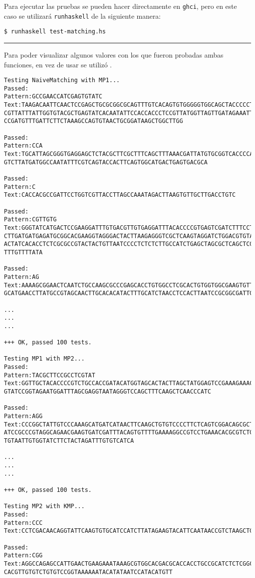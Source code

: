 Para ejecutar las pruebas se pueden hacer directamente en \texttt{ghci}, pero en 
este caso se utilizará \texttt{runhaskell} de la siguiente manera:

\texttt{\$ runhaskell test-matching.hs}

\noindent\rule{\textwidth}{1pt}
Para poder visualizar algunos valores con los que fueron probadas ambas 
funciones, en vez de usar  se utilizó .

\begin{verbatim}
Testing NaiveMatching with MP1...
Passed:
Pattern:GCCGAACCATCGAGTGTATC
Text:TAAGACAATTCAACTCCGAGCTGCGCGGCGCAGTTTGTCACAGTGTGGGGGTGGCAGCTACCCCCTAAG
CGTTATTTATTGGTGTACGCTGAGTATCACAATATTCCACCACCCTCCGTTATGGTTAGTTGATAGAAATTCGA
CCGATGTTTGATTCTTCTAAAGCCAGTGTAACTGCGGATAAGCTGGCTTGG

Passed:
Pattern:CCA
Text:TGCATTAGCGGGTGAGGAGCTCTACGCTTCGCTTTCAGCTTTAAACGATTATGTGCGGTCACCCCAATT
GTCTTATGATGGCCAATATTTCGTCAGTACCACTTCAGTGGCATGACTGAGTGACGCA

Passed:
Pattern:C
Text:CACCACGCCGATTCCTGGTCGTTACCTTAGCCAAATAGACTTAAGTGTTGCTTGACCTGTC

Passed:
Pattern:CGTTGTG
Text:GGGTATCATGACTCCGAAGGATTTGTGACGTTGTGAGGATTTACACCCCGTGAGTCGATCTTTCCTGGT
CTTGATGATGAGATGCGGCACGAAGGTAGGGACTACTTAAGAGGGTCGCTCAAGTAGGATCTGGACGTGTACAG
ACTATCACACCTCTCGCGCCGTACTACTGTTAATCCCCTCTCTCTTGCCATCTGAGCTAGCGCTCAGCTCGATA
TTTGTTTTATA

Passed:
Pattern:AG
Text:AAAAGCGGAACTCAATCTGCCAAGCGCCCGAGCACCTGTGGCCTCGCACTGTGGTGGCGAAGTGTTAAG
GCATGAACCTTATGCCGTAGCAACTTGCACACATACTTTGCATCTAACCTCCACTTAATCCGCGGCGATTGCAT

...
...
...

+++ OK, passed 100 tests.

Testing MP1 with MP2...
Passed:
Pattern:TACGCTTCCGCCTCGTAT
Text:GGTTGCTACACCCCGTCTGCCACCGATACATGGTAGCACTACTTAGCTATGGAGTCCGAAAGAAACCAG
GTATCCGGTAGAATGGATTTAGCGAGGTAATAGGGTCCAGCTTTCAAGCTCAACCCATC

Passed:
Pattern:AGG
Text:CCCGGCTATTGTCCCAAAGCATGATCATAACTTCAAGCTGTGTCCCCTTCTCAGTCGGACAGCGCTAGA
ATCCGCCCGTAGGCAGAACGAAGTGATCGATTTACAGTGTTTTGAAAAGGCCGTCCTGAAACACGCGTCTGTTA
TGTAATTGTGGTATCTTCTACTAGATTTGTGTCATCA

...
...
...

+++ OK, passed 100 tests.

Testing MP2 with KMP...
Passed:
Pattern:CCC
Text:CCTCGACAACAGGTATTCAAGTGTGCATCCATCTTATAGAAGTACATTCAATAACCGTCTAAGCTGCTG

Passed:
Pattern:CGG
Text:AGGCCAGAGCCATTGAACTGAAGAAATAAAGCGTGGCACGACGCACCACCTGCCGCATCTCTCGGCGCA
CACGTTGTGTCTGTGTCCGGTAAAAAATACATATAATCCATACATGTT


\end{verbatim}
